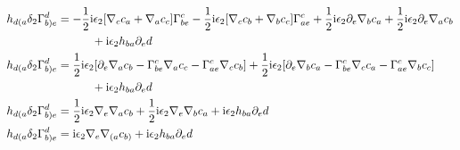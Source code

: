 \begin{align*}
    h_{d(a}\delta_2\Gamma^d_{b)e}&=-\frac12\textnormal{i}\epsilon_2\qty[\nabla_{c}c_{a}+\nabla_{a}c_{c}]\Gamma^c_{be}-\frac12\textnormal{i}\epsilon_2\qty[\nabla_{c}c_{b}+\nabla_{b}c_{c}]\Gamma^c_{ae}+\frac12\textnormal{i}\epsilon_2\partial_e\nabla_{b}c_{a}+\frac12\textnormal{i}\epsilon_2\partial_e\nabla_{a}c_{b}\\
    &\quad\quad\quad+\textnormal{i}\epsilon_2h_{ba}\partial_ed\\
    h_{d(a}\delta_2\Gamma^d_{b)e}&=\frac12\textnormal{i}\epsilon_2\qty[\partial_e\nabla_{a}c_{b}-\Gamma^c_{be}\nabla_{a}c_{c}-\Gamma^c_{ae}\nabla_{c}c_{b}]+\frac12\textnormal{i}\epsilon_2\qty[\partial_e\nabla_{b}c_{a}-\Gamma^c_{be}\nabla_{c}c_{a}-\Gamma^c_{ae}\nabla_{b}c_{c}]\\
    &\quad\quad\quad+\textnormal{i}\epsilon_2h_{ba}\partial_ed\\
    h_{d(a}\delta_2\Gamma^d_{b)e}&=\frac12\textnormal{i}\epsilon_2\nabla_e\nabla_{a}c_{b}+\frac12\textnormal{i}\epsilon_2\nabla_e\nabla_{b}c_{a}+\textnormal{i}\epsilon_2h_{ba}\partial_ed\\
    h_{d(a}\delta_2\Gamma^d_{b)e}&=\textnormal{i}\epsilon_2\nabla_e\nabla_{(a}c_{b)}+\textnormal{i}\epsilon_2h_{ba}\partial_ed
\end{align*}